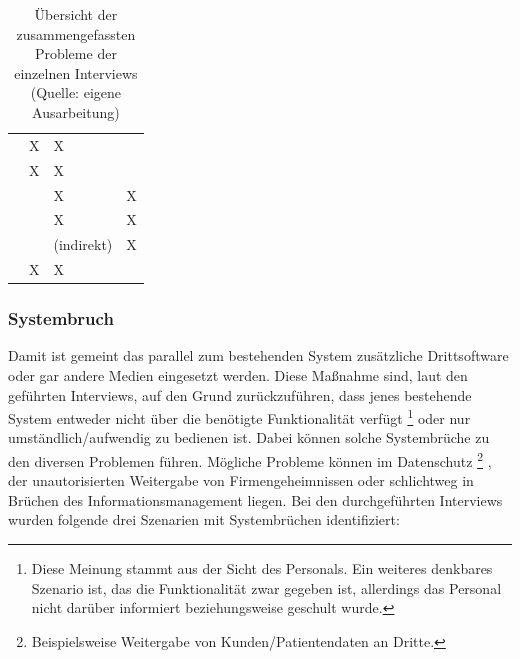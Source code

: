 \documentclass[Bachelorarbeit.tex]{subfiles}
\begin{document}
\def\arraystretch{1.5} %
\begin{table}[h!]
	\begin{tabular}{|p{5cm}|p{}|p{}|p{}|}
		\hline  
		& \ctab \nameref{anhang:interview1} 
		& \ctab \nameref{anhang:interview2} 
		& \ctab \nameref{anhang:interview3} \\ 
		\hline 
		\nameref{p1}
		& \ctab X
		& \ctab X
		& \ctab  \\ 
		\hline 
		\nameref{p2}
		& \ctab  X
		& \ctab X
		& \ctab  \\ 
		
		\hline 
		\nameref{p3}
		& \ctab  
		& \ctab X
		& \ctab X \\ 
		\hline 
		\nameref{p4}
		& \ctab 
		& \ctab  X
		& \ctab X \\ 
		\hline 
		\nameref{p5}
		& \ctab 
		& \ctab (indirekt)
		& \ctab X \\ 
		\hline 
		\nameref{p6}
		& \ctab X
		& \ctab X
		& \ctab  \\ 
		\hline 
	
	\end{tabular} 
	\caption[Zusammenfassung der Probleme]{Übersicht der zusammengefassten Probleme der einzelnen Interviews (Quelle: eigene Ausarbeitung)}
	\label{tab:problemeInterviews}
\end{table}


\subsubsection*{Systembruch}
\label{interviewsAnalyseSystembruch}
Damit ist gemeint das parallel zum bestehenden System zusätzliche Drittsoftware oder gar andere Medien eingesetzt werden.
Diese Maßnahme sind, laut den geführten Interviews, auf den Grund zurückzuführen, dass jenes bestehende System entweder nicht über die benötigte Funktionalität verfügt
\footnote{
	Diese Meinung stammt aus der Sicht des Personals. 
	Ein weiteres denkbares Szenario ist, das die Funktionalität zwar gegeben ist, allerdings das Personal nicht darüber informiert beziehungsweise geschult wurde.
	} 
oder nur umständlich/aufwendig zu bedienen ist.
Dabei können solche Systembrüche zu den diversen Problemen führen. 
Mögliche Probleme können im Datenschutz
\footnote{
	Beispielsweise Weitergabe von Kunden/Patientendaten an Dritte.
	}
	, der unautorisierten Weitergabe von Firmengeheimnissen oder schlichtweg in Brüchen des Informationsmanagement liegen.  
Bei den durchgeführten Interviews wurden folgende drei Szenarien mit Systembrüchen identifiziert:
\end{document}
